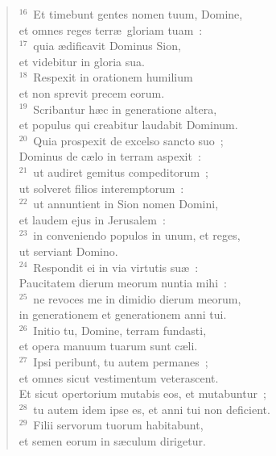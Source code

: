 \begin{flushleft}
\begin{verse}
${}^{16}$~Et timebunt gentes nomen tuum, Domine,\\ et omnes reges terr\ae\ gloriam tuam~:\\
${}^{17}$~quia \ae dificavit Dominus Sion,\\ et videbitur in gloria sua.\\
${}^{18}$~Respexit in orationem humilium\\ et non sprevit precem eorum.\\
${}^{19}$~Scribantur h\ae c in generatione altera,\\ et populus qui creabitur laudabit Dominum.\\
${}^{20}$~Quia prospexit de excelso sancto suo~;\\ Dominus de c\ae lo in terram aspexit~:\\
${}^{21}$~ut audiret gemitus compeditorum~;\\ ut solveret filios interemptorum~:\\
${}^{22}$~ut annuntient in Sion nomen Domini,\\ et laudem ejus in Jerusalem~:\\
${}^{23}$~in conveniendo populos in unum, et reges,\\ ut serviant Domino.\\
${}^{24}$~Respondit ei in via virtutis su\ae~:\\ Paucitatem dierum meorum nuntia mihi~:\\
${}^{25}$~ne revoces me in dimidio dierum meorum,\\ in generationem et generationem anni tui.\\
${}^{26}$~Initio tu, Domine, terram fundasti,\\ et opera manuum tuarum sunt c\ae li.\\
${}^{27}$~Ipsi peribunt, tu autem permanes~;\\ et omnes sicut vestimentum veterascent.\\ Et sicut opertorium mutabis eos, et mutabuntur~;\\
${}^{28}$~tu autem idem ipse es, et anni tui non deficient.\\
${}^{29}$~Filii servorum tuorum habitabunt,\\ et semen eorum in s\ae culum dirigetur.\end{verse}\end{flushleft}


